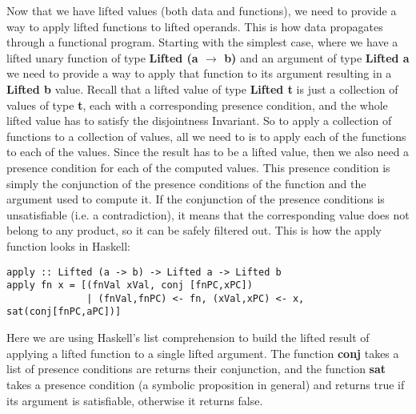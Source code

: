 \documentclass[11pt]{article} %
\begin{document}
Now that we have lifted values (both data and functions), we need to provide a way to apply lifted functions to lifted operands. This is how data propagates through a functional program. Starting with the simplest case, where we have a lifted unary function of type \textbf{Lifted (a $\to$ b)} and an argument of type \textbf{Lifted a} we need to provide a way to apply that function to its argument resulting in a \textbf{Lifted b} value.
Recall that a lifted value of type \textbf{Lifted t} is just a collection of values of type \textbf{t}, each with a corresponding presence condition, and the whole lifted value has to satisfy the disjointness Invariant. So to apply a collection of functions to a collection of values, all we need to is to apply each of the functions to each of the values. Since the result has to be a lifted value, then we also need a presence condition for each of the computed values. This presence condition is simply the conjunction of the presence conditions of the function and the argument used to compute it. If the conjunction of the presence conditions is unsatisfiable (i.e. a contradiction), it means that the corresponding value does not belong to any product, so it can be safely filtered out. This is how the apply function looks in Haskell:

\begin{verbatim}
apply :: Lifted (a -> b) -> Lifted a -> Lifted b
apply fn x = [(fnVal xVal, conj [fnPC,xPC]) 
              | (fnVal,fnPC) <- fn, (xVal,xPC) <- x, sat(conj[fnPC,aPC])] 
\end{verbatim}

Here we are using Haskell's list comprehension to build the lifted result of applying a lifted function to a single lifted argument. The function \textbf{conj} takes a list of presence conditions are returns their conjunction, and the function \textbf{sat} takes a presence condition (a symbolic proposition in general) and returns true if its argument is satisfiable, otherwise it returns false.
\end{document}
